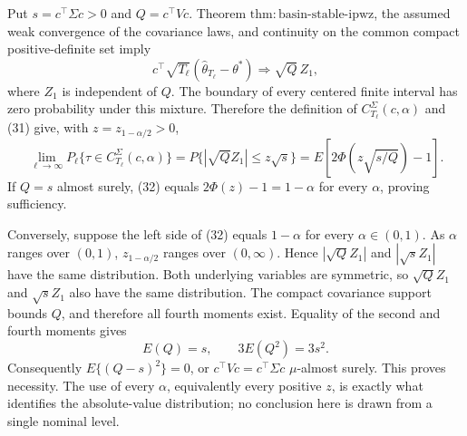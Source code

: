 Put \(s=c^\top\Sigma c>0\) and \(Q=c^\top Vc\).  Theorem \(\mathrm{thm:basin\text{-}stable\text{-}ipwz}\), the assumed weak convergence of the covariance laws, and continuity on the common compact positive-definite set imply
\[
 c^\top\sqrt{T_\ell}(\widehat\theta_{T_\ell}-\theta^*)
 \Rightarrow \sqrt Q\,Z_1,                                                \tag{31}
\]
where \(Z_1\) is independent of \(Q\).  The boundary of every centered finite interval has zero probability under this mixture.  Therefore the definition of \(C_{T_\ell}^{\Sigma}(c,\alpha)\) and (31) give, with \(z=z_{1-\alpha/2}>0\),
\[
 \lim_{\ell\to\infty}P_\ell\{\tau\in C_{T_\ell}^{\Sigma}(c,\alpha)\}
 =P\{|\sqrt QZ_1|\le z\sqrt s\}
 =E\!\left[2\Phi\!\left(z\sqrt{s/Q}\right)-1\right].                 \tag{32}
\]
If \(Q=s\) almost surely, (32) equals \(2\Phi(z)-1=1-\alpha\) for every \(\alpha\), proving sufficiency.

Conversely, suppose the left side of (32) equals \(1-\alpha\) for every \(\alpha\in(0,1)\).  As \(\alpha\) ranges over \((0,1)\), \(z_{1-\alpha/2}\) ranges over \((0,\infty)\).  Hence \(|\sqrt QZ_1|\) and \(|\sqrt sZ_1|\) have the same distribution.  Both underlying variables are symmetric, so \(\sqrt QZ_1\) and \(\sqrt sZ_1\) also have the same distribution.  The compact covariance support bounds \(Q\), and therefore all fourth moments exist.  Equality of the second and fourth moments gives
\[
 E(Q)=s,
 \qquad
 3E(Q^2)=3s^2.
\]
Consequently \(E\{(Q-s)^2\}=0\), or \(c^\top Vc=c^\top\Sigma c\) \(\mu\)-almost surely.  This proves necessity.  The use of every \(\alpha\), equivalently every positive \(z\), is exactly what identifies the absolute-value distribution; no conclusion here is drawn from a single nominal level.